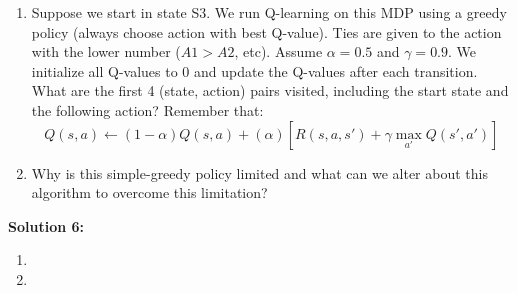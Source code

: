 \documentclass[]{article}
\begin{document}
\begin{enumerate}[label=(\alph*)]   
    \item Suppose we start in state S3. We run Q-learning on this MDP using a greedy policy (always choose action with best Q-value). Ties are given to the action with the lower number ($A1 > A2$, etc). Assume $\alpha=0.5$ and $\gamma=0.9$. We initialize all Q-values to 0 and update the Q-values after each transition. What are the first 4 (state, action) pairs visited, including the start state and the following action? Remember that: $$Q(s,a) \leftarrow (1-\alpha)Q(s,a) + (\alpha)[R(s,a,s') + \gamma \max_{a'}Q(s',a')]$$
    \item Why is this simple-greedy policy limited and what can we alter about this algorithm to overcome this limitation? 
\end{enumerate}

\bigskip

\textbf{Solution 6:}
\begin{enumerate}[label=(\alph*)]
    \item %
    \item %
\end{enumerate}
\end{document}
